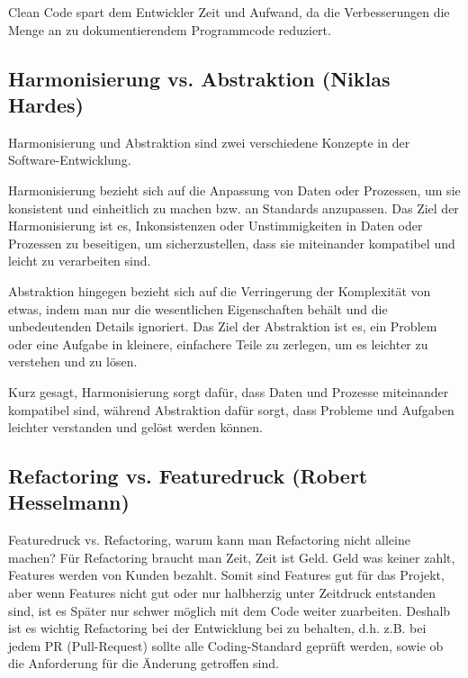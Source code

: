 Clean Code spart dem Entwickler Zeit und Aufwand, da die Verbesserungen die Menge an zu dokumentierendem Programmcode reduziert. 




\subsection*{Harmonisierung vs. Abstraktion (Niklas Hardes)}

Harmonisierung und Abstraktion sind zwei verschiedene Konzepte in der Software-Entwicklung.

Harmonisierung bezieht sich auf die Anpassung von Daten oder Prozessen, um sie konsistent und einheitlich zu machen bzw. an Standards anzupassen. Das Ziel der Harmonisierung ist es, Inkonsistenzen oder Unstimmigkeiten in Daten oder Prozessen zu beseitigen, um sicherzustellen, dass sie miteinander kompatibel und leicht zu verarbeiten sind.

Abstraktion hingegen bezieht sich auf die Verringerung der Komplexität von etwas, indem man nur die wesentlichen Eigenschaften behält und die unbedeutenden Details ignoriert. Das Ziel der Abstraktion ist es, ein Problem oder eine Aufgabe in kleinere, einfachere Teile zu zerlegen, um es leichter zu verstehen und zu lösen.

Kurz gesagt, Harmonisierung sorgt dafür, dass Daten und Prozesse miteinander kompatibel sind, während Abstraktion dafür sorgt, dass Probleme und Aufgaben leichter verstanden und gelöst werden können.

\newpage

\subsection*{Refactoring vs. Featuredruck (Robert Hesselmann)}
Featuredruck vs. Refactoring, warum kann man Refactoring nicht alleine machen? Für Refactoring braucht man Zeit, Zeit ist Geld. Geld was keiner zahlt, Features werden von Kunden bezahlt. Somit sind Features gut für das Projekt, aber wenn Features nicht gut oder nur halbherzig unter Zeitdruck entstanden sind, ist es Später nur schwer möglich mit dem Code weiter zuarbeiten. Deshalb ist es wichtig Refactoring bei der Entwicklung bei zu behalten, d.h. z.B. bei jedem PR (Pull-Request) sollte alle Coding-Standard geprüft werden, sowie ob die Anforderung für die Änderung getroffen sind.